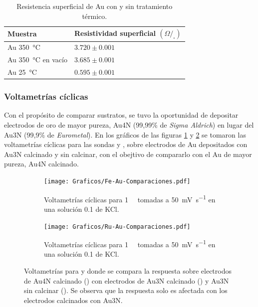 {				\begin{table}[ht!]
			  		  \caption[Resistencia superficial de los electrodos]{Resistencia superficial de Au con y sin tratamiento térmico.} 
			  		  \begin{tabular}{>{\raggedright\arraybackslash}m{3.6cm}>{\raggedright\arraybackslash}m{5cm}} 
			  		  \toprule
					  Muestra & Resistividad superficial $(\Omega/_{\square})$  \\ \midrule
			      	  Au \SI{350}{\celsius} 		  	& $3.720 \pm 0.001$		 \\	  
			      	  Au \SI{350}{\celsius} en vacío	& $3.685 \pm 0.001$		 \\	  
			      	  Au \SI{25}{\celsius}    	  		& $0.595 \pm 0.001$		 \\ 
			      	  \bottomrule
			    	  \end{tabular}
			    	  \label{tabla:resistencia}
			   		  \end{table}
		
		\subsubsection{Voltametrías cíclicas}

			Con el propósito de comparar sustratos, se tuvo la oportunidad de depositar electrodos de oro de mayor pureza, Au4N (99,99\% de \textit{Sigma Aldrich}) en lugar del Au3N (99,9\% de \textit{Eurometal}). En los gráficos de las figuras \ref{fig:Fe-Au-compa} y \ref{fig:Ru-Au-compa} se tomaron las voltametrías cíclicas para las sondas \aminorutenio\space  y \ferroferri, sobre electrodos de Au depositados con Au3N calcinado y sin calcinar, con el obejtivo de compararlo con el Au de mayor pureza, Au4N calcinado. 

				\begin{figure}[ht]
		 	      \begin{subfigure}[t]{0.495\textwidth}
		          	\texttt{[image: Graficos/Fe-Au-Comparaciones.pdf]}
		         	\caption{Voltametrías cíclicas para \fe\space \SI{1}{\milli\Molar} tomadas a \SI{50}{\milli\volt\per\second} en una solución \SI{0.1}{\Molar} de KCl.}
		          	\label{fig:Fe-Au-compa}
		      		\end{subfigure}
		      	 \begin{subfigure}[t]{0.495\textwidth}
		          	\texttt{[image: Graficos/Ru-Au-Comparaciones.pdf]}
		         	\caption{Voltametrías cíclicas para \ru\space \SI{1}{\milli\Molar} tomadas a \SI{50}{\milli\volt\per\second} en una solución \SI{0.1}{\Molar} de KCl.}
		          	\label{fig:Ru-Au-compa}
		      		\end{subfigure}
		      	 \caption[Comparación entre electrodos calcinados y sin calcinar]{Voltametrías para \fe\space y \ru\space donde se compara la respuesta sobre electrodos de Au4N calcinado (\usebox{\oliva}) con electrodos de Au3N calcinado (\usebox{\negro}) y Au3N sin calcinar (\usebox{\rojo}). Se observa que la respuesta solo es afectada con los electrodos calcinados con Au3N.}
		      	 \label{Fig:Comparacion-Au}
	      		 \end{figure}	

}
